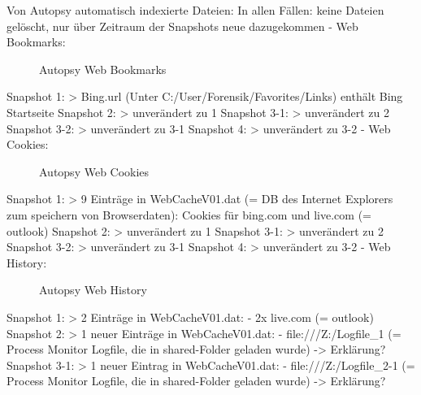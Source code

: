 Von Autopsy automatisch indexierte Dateien: 
In allen Fällen: keine Dateien gelöscht, nur über Zeitraum der Snapshots neue dazugekommen
- Web Bookmarks:
	\begin{figure}[h!]
		\centerline{}
		\label{chart:final-criteria}  
		\caption{Autopsy Web Bookmarks}
	\end{figure}
	Snapshot 1:
		> Bing.url (Unter C:/User/Forensik/Favorites/Links) enthält Bing Startseite
	Snapshot 2:
		> unverändert zu 1
	Snapshot 3-1:
		> unverändert zu 2
	Snapshot 3-2:	
		> unverändert zu 3-1
	Snapshot 4:
		> unverändert zu 3-2
- Web Cookies:
	\begin{figure}[h!]
		\centerline{}
		\label{chart:final-criteria}  
		\caption{Autopsy Web Cookies}
	\end{figure}
	Snapshot 1:
		> 9 Einträge in WebCacheV01.dat (= DB des Internet Explorers zum speichern von Browserdaten): Cookies für bing.com und live.com (= outlook)
	Snapshot 2:
		> unverändert zu 1
	Snapshot 3-1:
		> unverändert zu 2
	Snapshot 3-2:
		> unverändert zu 3-1
	Snapshot 4:
		> unverändert zu 3-2
- Web History:
	\begin{figure}[h!]
		\centerline{}
		\label{chart:final-criteria}  
		\caption{Autopsy Web History}
	\end{figure}
	Snapshot 1:
		> 2 Einträge in WebCacheV01.dat:
			- 2x live.com (= outlook)
	Snapshot 2:
		> 1 neuer Einträge in WebCacheV01.dat:
			- file:///Z:/Logfile\_1 (= Process Monitor Logfile, die in shared-Folder geladen wurde) -> Erklärung?
	Snapshot 3-1:
		> 1 neuer Eintrag in WebCacheV01.dat:
			- file:///Z:/Logfile\_2-1 (= Process Monitor Logfile, die in shared-Folder geladen wurde) -> Erklärung?
